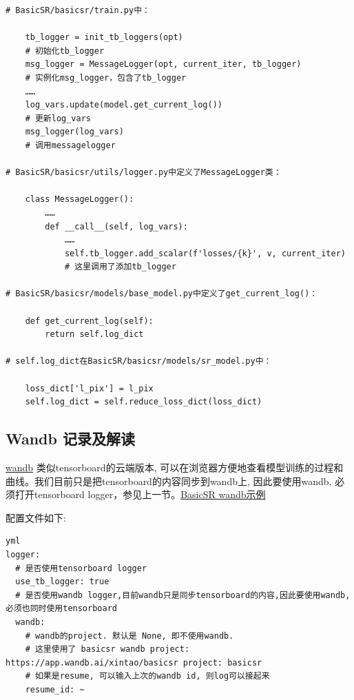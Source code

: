 \documentclass[../main.tex]{subfiles}
\begin{document}
\begin{verbatim}
# BasicSR/basicsr/train.py中：

    tb_logger = init_tb_loggers(opt)
    # 初始化tb_logger
    msg_logger = MessageLogger(opt, current_iter, tb_logger)
    # 实例化msg_logger，包含了tb_logger
    ……
    log_vars.update(model.get_current_log())
    # 更新log_vars
    msg_logger(log_vars)
    # 调用messagelogger

# BasicSR/basicsr/utils/logger.py中定义了MessageLogger类：

    class MessageLogger():
        ……
        def __call__(self, log_vars):
            ……
            self.tb_logger.add_scalar(f'losses/{k}', v, current_iter)
            # 这里调用了添加tb_logger
            
# BasicSR/basicsr/models/base_model.py中定义了get_current_log()：

    def get_current_log(self):
        return self.log_dict

# self.log_dict在BasicSR/basicsr/models/sr_model.py中：

    loss_dict['l_pix'] = l_pix
    self.log_dict = self.reduce_loss_dict(loss_dict)
\end{verbatim}


\subsection{Wandb 记录及解读}

\href{https://www.wandb.com/}{wandb} 类似tensorboard的云端版本, 可以在浏览器方便地查看模型训练的过程和曲线。我们目前只是把tensorboard的内容同步到wandb上, 因此要使用wandb, 必须打开tensorboard logger，参见上一节。\href{https://wandb.ai/xintao/basicsr?workspace=user-}{BasicSR wandb示例}

配置文件如下:
\begin{verbatim}
yml
logger:
  # 是否使用tensorboard logger
  use_tb_logger: true
  # 是否使用wandb logger,目前wandb只是同步tensorboard的内容,因此要使用wandb, 必须也同时使用tensorboard
  wandb:
    # wandb的project. 默认是 None, 即不使用wandb.
    # 这里使用了 basicsr wandb project: https://app.wandb.ai/xintao/basicsr project: basicsr
    # 如果是resume, 可以输入上次的wandb id, 则log可以接起来
    resume_id: ~
\end{verbatim}
\end{document}
